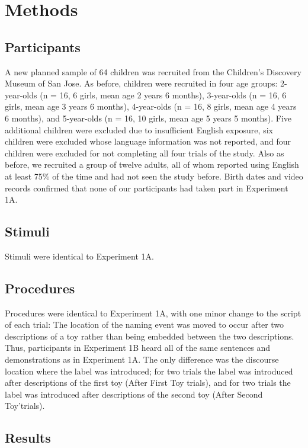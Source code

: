 \documentclass[man]{apa2}
\begin{document}
\section{Methods}

\subsection{Participants}

A new planned sample of 64 children was recruited from the Children's Discovery Museum of San Jose. As before, children were recruited in four age groups: 2-year-olds (n = 16, 6 girls, mean age 2 years 6 months), 3-year-olds  (n = 16, 6 girls, mean age 3 years 6 months), 4-year-olds (n = 16, 8 girls, mean age 4 years 6 months), and 5-year-olds (n = 16, 10 girls, mean age 5 years 5 months).  Five additional children were excluded due to insufficient English exposure, six children were excluded whose language information was not reported, and four children were excluded for not completing all four trials of the study.  Also as before, we recruited a group of twelve adults, all of whom reported using English at least 75\% of the time and had not seen the study before.  Birth dates and video records confirmed that none of our participants had taken part in Experiment 1A. 

\subsection{Stimuli}

Stimuli were identical to Experiment 1A. 

\subsection{Procedures}

Procedures were identical to Experiment 1A, with one minor change to the script of each trial: The location of the naming event was moved to occur after two descriptions of a toy rather than being embedded between the two descriptions. Thus, participants in Experiment 1B heard all of the same sentences and demonstrations as in Experiment 1A.  The only difference was the discourse location where the label was introduced; for two trials the label was introduced after descriptions of the first toy (After First Toy trials), and for two trials the label was introduced after descriptions of the second toy (After Second Toy'trials).  

\subsection{Results}
\end{document}
